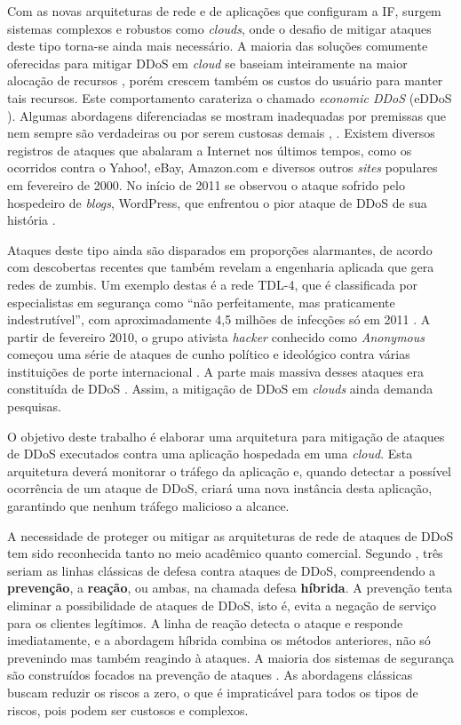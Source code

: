 Com as novas arquiteturas de rede e de aplicações que configuram a IF, surgem sistemas complexos e robustos como \emph{clouds}, onde o desafio de mitigar ataques deste tipo torna-se ainda mais necessário.  A maioria das soluções comumente oferecidas para mitigar DDoS em \emph{cloud} se baseiam inteiramente na maior alocação de
recursos \cite{Peng:2007:SND:1216370.1216373}, porém crescem  também os custos do usuário para manter tais recursos. Este comportamento
carateriza o chamado \emph{economic DDoS} (eDDoS \cite{Soon:10}).  %
%
Algumas abordagens diferenciadas se mostram inadequadas por premissas que nem sempre são verdadeiras ou por serem custosas demais \cite{Bakshi:10}, \cite{Liu:2010:NFD:1866835.1866849}.
Existem diversos registros de ataques que abalaram a Internet nos últimos tempos, como os ocorridos contra o Yahoo!, eBay, Amazon.com e diversos outros \emph{sites} populares em fevereiro de 2000.  No início de 2011 se observou o ataque sofrido pelo hospedeiro de \emph{blogs}, WordPress, que enfrentou o pior ataque de DDoS de sua história \cite{infoexame}.

Ataques deste tipo ainda são disparados em proporções alarmantes, de acordo com descobertas recentes que também revelam a engenharia aplicada que gera redes de zumbis. Um exemplo destas é a rede TDL-4, que é classificada por especialistas em segurança como “não perfeitamente, mas praticamente indestrutível”, com aproximadamente 4,5 milhões de infecções só em 2011 \cite{tdl4}. A partir de fevereiro 2010, o grupo ativista \textit{hacker} conhecido como \textit{Anonymous} começou uma série de ataques de cunho político e ideológico contra várias instituições de porte internacional \cite{titstorm}. A parte mais massiva desses ataques era constituída de DDoS \cite{infoexame}.  Assim, a mitigação de DDoS em \emph{clouds} ainda demanda pesquisas.

O objetivo deste trabalho é elaborar uma arquitetura para mitigação de ataques de
DDoS executados contra uma aplicação hospedada em uma \emph{cloud}. Esta
arquitetura deverá monitorar o tráfego da aplicação e, quando
detectar a possível ocorrência de um ataque de DDoS, criará uma nova
instância desta aplicação, garantindo que nenhum tráfego malicioso a alcance. 

A necessidade de proteger ou mitigar as arquiteturas de rede de ataques de DDoS tem sido reconhecida tanto no meio acadêmico quanto comercial. Segundo \cite{1039856}, três seriam as linhas clássicas de defesa contra ataques de DDoS, compreendendo a \textbf{prevenção}, a \textbf{reação}, ou ambas, na chamada defesa \textbf{híbrida}. A prevenção tenta eliminar a possibilidade de ataques de DDoS, isto é, evita a negação de serviço para os clientes legítimos. A linha de reação detecta o ataque e responde imediatamente, e a abordagem híbrida combina os métodos anteriores, não só prevenindo mas também reagindo à ataques. A maioria dos sistemas de segurança são construídos focados na prevenção de ataques \cite{4429182}. As abordagens clássicas buscam reduzir os riscos a zero, o que é impraticável para todos os tipos de riscos, pois podem ser custosos e complexos.

